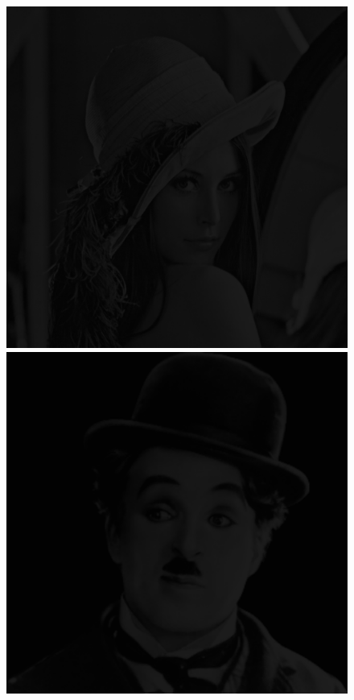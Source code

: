 \documentclass{article}
\begin{document}
\begin{figure}[!htb]
\centering
\includegraphics[scale=0.2]{img/dark_lena_8bit.png} 
\includegraphics[scale=0.2]{img/dark_gray.png} 

\end{figure}
\end{document}
